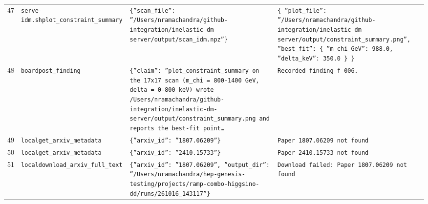 \documentclass[11pt,a4paper]{article}
\begin{document}
\begin{longtable}{@{}p{}p{}p{}p{}@{}}
47 & \texttt{serve-idm.sh}\newline\texttt{plot\_\allowbreak{}constraint\_\allowbreak{}summary} & \texttt{\{''scan\_\allowbreak{}file'':\allowbreak{} ''/\allowbreak{}Users/\allowbreak{}nramachandra/\allowbreak{}github-integration/\allowbreak{}inelastic-dm-server/\allowbreak{}output/\allowbreak{}scan\_\allowbreak{}idm.npz''\}\allowbreak{}} & \texttt{\{   ''plot\_\allowbreak{}file'':\allowbreak{} ''/\allowbreak{}Users/\allowbreak{}nramachandra/\allowbreak{}github-integration/\allowbreak{}inelastic-dm-server/\allowbreak{}output/\allowbreak{}constraint\_\allowbreak{}summary.png'',\allowbreak{}   ''best\_\allowbreak{}fit'':\allowbreak{} \{     ''m\_\allowbreak{}chi\_\allowbreak{}GeV'':\allowbreak{} 988.0,\allowbreak{}     ''delta\_\allowbreak{}keV'':\allowbreak{} 350.0   \}\allowbreak{} \}\allowbreak{}} \\
48 & \texttt{board}\newline\texttt{post\_\allowbreak{}finding} & \texttt{\{''claim'':\allowbreak{} ''plot\_\allowbreak{}constraint\_\allowbreak{}summary on the 17x17 scan (m\_\allowbreak{}chi =\allowbreak{} 800-1400 GeV,\allowbreak{} delta =\allowbreak{} 0-800 keV)\allowbreak{} wrote /\allowbreak{}Users/\allowbreak{}nramachandra/\allowbreak{}github-integration/\allowbreak{}inelastic-dm-server/\allowbreak{}output/\allowbreak{}constraint\_\allowbreak{}summary.png and reports the best-fit point\ldots{}\allowbreak{}} & \texttt{Recorded finding f-006.} \\
49 & \texttt{local}\newline\texttt{get\_\allowbreak{}arxiv\_\allowbreak{}metadata} & \texttt{\{''arxiv\_\allowbreak{}id'':\allowbreak{} ''1807.06209''\}\allowbreak{}} & \texttt{Paper 1807.06209 not found} \\
50 & \texttt{local}\newline\texttt{get\_\allowbreak{}arxiv\_\allowbreak{}metadata} & \texttt{\{''arxiv\_\allowbreak{}id'':\allowbreak{} ''2410.15733''\}\allowbreak{}} & \texttt{Paper 2410.15733 not found} \\
51 & \texttt{local}\newline\texttt{download\_\allowbreak{}arxiv\_\allowbreak{}full\_\allowbreak{}text} & \texttt{\{''arxiv\_\allowbreak{}id'':\allowbreak{} ''1807.06209'',\allowbreak{} ''output\_\allowbreak{}dir'':\allowbreak{} ''/\allowbreak{}Users/\allowbreak{}nramachandra/\allowbreak{}hep-genesis-testing/\allowbreak{}projects/\allowbreak{}ramp-combo-higgsino-dd/\allowbreak{}runs/\allowbreak{}261016\_\allowbreak{}143117''\}\allowbreak{}} & \texttt{Download failed:\allowbreak{} Paper 1807.06209 not found} \\

\end{longtable}
\end{document}
